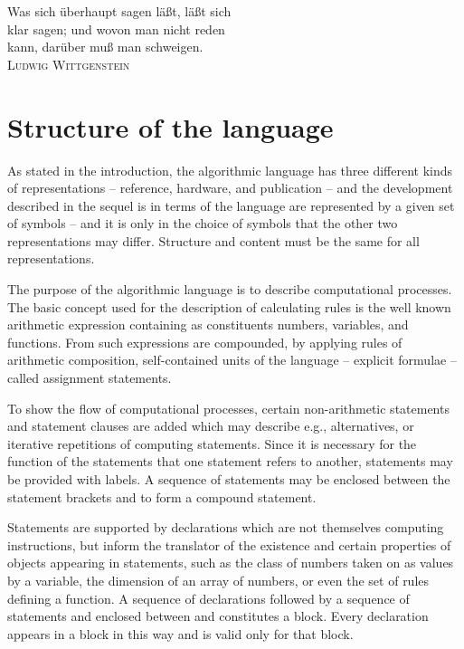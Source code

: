 \documentclass[a4paper,11pt]{article}
\begin{document}

\hspace*{7cm} Was sich \"u{}berhaupt sagen l\"a{}\ss{}t, l\"a{}\ss{}t sich\\
\hspace*{7cm} klar sagen; und wovon man nicht reden\\
\hspace*{7cm} kann, dar\"u{}ber mu\ss{} man schweigen.\\
\hspace*{9cm} \textsc{Ludwig Wittgenstein}

\section{Structure of the language}
\label{LblStructureOfTheLanguage}


As stated in the introduction, the algorithmic language has three
different kinds of representations -- reference, hardware, and
publication -- and the development described in the sequel is in terms
of the language are represented by a given set of symbols -- and it is
only in the choice of symbols that the other two representations may
differ. Structure and content must be the same for all
representations.

The purpose of the algorithmic language is to describe computational
processes. The basic concept used for the description of calculating
rules is the well known arithmetic expression containing as constituents
numbers, variables, and functions. From such expressions are compounded,
by applying rules of arithmetic composition, self-contained units of the
language -- explicit formulae -- called assignment statements.

To show the flow of computational processes, certain non-arithmetic
statements and statement clauses are added which may describe e.g.,
alternatives, or iterative repetitions of computing statements. Since it
is necessary for the function of the statements that one statement
refers to another, statements may be provided with labels. A sequence of
statements may be enclosed between the statement brackets 
and  to form a compound statement.

Statements are supported by declarations which are not themselves
computing instructions, but inform the translator of the existence and
certain properties of objects appearing in statements, such as the class
of numbers taken on as values by a variable, the dimension of an array
of numbers, or even the set of rules defining a function. A sequence of
declarations followed by a sequence of statements and enclosed between
 and  constitutes a block. Every declaration
appears in a block in this way and is valid only for that block.
\end{document}
